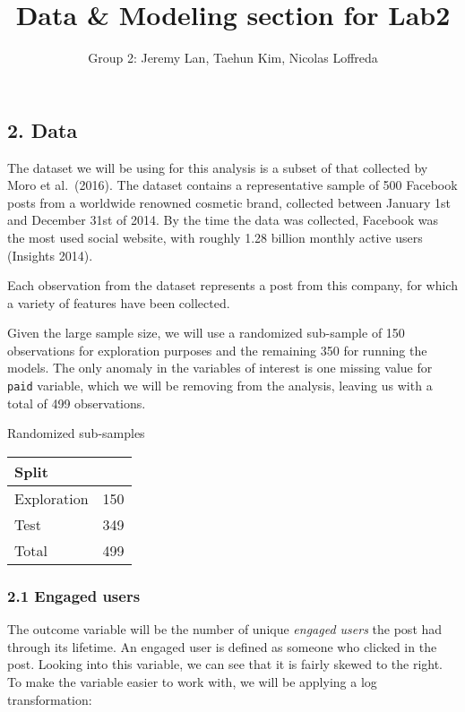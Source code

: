 \documentclass[
]{article}
\title{Data \& Modeling section for Lab2}
\author{Group 2: Jeremy Lan, Taehun Kim, Nicolas Loffreda}
\date{}
\begin{document}
\maketitle

\hypertarget{data}{%
\subsection{2. Data}\label{data}}

The dataset we will be using for this analysis is a subset of that
collected by Moro et al.~(2016). The dataset contains a representative
sample of 500 Facebook posts from a worldwide renowned cosmetic brand,
collected between January 1st and December 31st of 2014. By the time the
data was collected, Facebook was the most used social website, with
roughly 1.28 billion monthly active users (Insights 2014).

Each observation from the dataset represents a post from this company,
for which a variety of features have been collected.

Given the large sample size, we will use a randomized sub-sample of 150
observations for exploration purposes and the remaining 350 for running
the models. The only anomaly in the variables of interest is one missing
value for \texttt{paid} variable, which we will be removing from the
analysis, leaving us with a total of 499 observations.

\begin{center}
  Randomized sub-samples
\end{center}

\begin{center}
  \begin{tabular}{l r}
    \hline
    Split     &  \\
    \hline
    Exploration & 150 \\
    Test        & 349             \\
    \hline
    Total       & 499             \\
    \hline
  \end{tabular}
\end{center}

\hypertarget{engaged-users}{%
\subsubsection{2.1 Engaged users}\label{engaged-users}}

The outcome variable will be the number of unique \emph{engaged users}
the post had through its lifetime. An engaged user is defined as someone
who clicked in the post. Looking into this variable, we can see that it
is fairly skewed to the right. To make the variable easier to work with,
we will be applying a log transformation:
\end{document}
